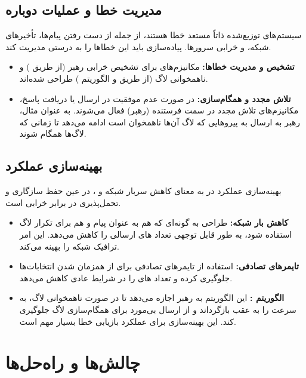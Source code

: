 \documentclass[12pt,a4paper]{article}
\begin{document}
\subsection{مدیریت خطا و عملیات دوباره}

سیستم‌های توزیع‌شده ذاتاً مستعد خطا هستند، از جمله از دست رفتن پیام‌ها، تأخیرهای شبکه، و خرابی سرورها. پیاده‌سازی  باید این خطاها را به درستی مدیریت کند.
\begin{itemize}
    \item \textbf{تشخیص و مدیریت خطاها:} مکانیزم‌های  برای تشخیص خرابی رهبر (از طریق ) و ناهمخوانی لاگ (از طریق  و الگوریتم  ) طراحی شده‌اند.
    \item \textbf{تلاش مجدد  و همگام‌سازی:} در صورت عدم موفقیت در ارسال  یا دریافت پاسخ، مکانیزم‌های تلاش مجدد در سمت فرستنده (رهبر) فعال می‌شوند. به عنوان مثال، رهبر به ارسال  به پیروهایی که لاگ آن‌ها ناهمخوان است ادامه می‌دهد تا زمانی که لاگ‌ها همگام شوند.
\end{itemize}

\subsection{بهینه‌سازی عملکرد}

بهینه‌سازی عملکرد در  به معنای کاهش سربار شبکه و ، در عین حفظ سازگاری و تحمل‌پذیری در برابر خرابی است.
\begin{itemize}
    \item \textbf{کاهش بار شبکه:} طراحی  به گونه‌ای که هم به عنوان پیام  و هم برای تکرار لاگ استفاده شود، به طور قابل توجهی تعداد های ارسالی را کاهش می‌دهد. این امر ترافیک شبکه را بهینه می‌کند.
    \item \textbf{تایمرهای تصادفی:} استفاده از تایمرهای تصادفی برای  از همزمان شدن انتخابات‌ها جلوگیری کرده و تعداد های  را در شرایط عادی کاهش می‌دهد.
    \item \textbf{الگوریتم  :} این الگوریتم به رهبر اجازه می‌دهد تا در صورت ناهمخوانی لاگ، به سرعت  را به عقب بازگرداند و از ارسال بی‌مورد  برای همگام‌سازی لاگ جلوگیری کند. این بهینه‌سازی برای عملکرد بازیابی خطا بسیار مهم است.
\end{itemize}

\section{چالش‌ها و راه‌حل‌ها}
\end{document}
